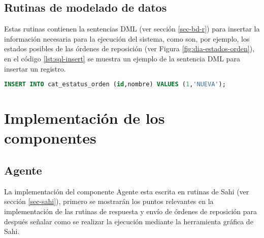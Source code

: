 \subsection{Rutinas de modelado de datos}
Estas rutinas contienen la sentencias DML (ver sección \ref{sec-bd-r}) para insertar la información necesaria para la ejecución del sistema, como son, por ejemplo, los estados posibles de las órdenes de reposición (ver Figura \ref{fig:dia-estados-orden}), en el código \ref{lst:sql-insert} se muestra un ejemplo de la sentencia DML para insertar un registro.

\begin{lstlisting}[language=SQL, caption={Sentencia insertar un registro.}, label={lst:sql-insert}]
INSERT INTO cat_estatus_orden (id,nombre) VALUES (1,'NUEVA');
\end{lstlisting}

%

\section{Implementación de los componentes}

\subsection{Agente}
La implementación del componente Agente esta escrita en rutinas de Sahi (ver sección \ref{sec-sahi}), primero se mostrarán los puntos relevantes en la implementación de las rutinas de respuesta y envío de órdenes de reposición para después señalar como se realizar la ejecución mediante la herramienta gráfica de Sahi.

